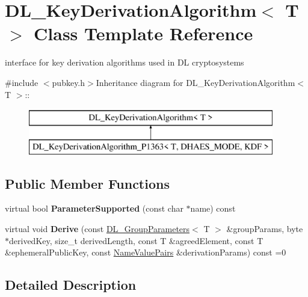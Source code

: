 \hypertarget{class_d_l___key_derivation_algorithm}{
\section{DL\_\-KeyDerivationAlgorithm$<$ T $>$ Class Template Reference}
\label{class_d_l___key_derivation_algorithm}
}


interface for key derivation algorithms used in DL cryptosystems  


{\ttfamily \#include $<$pubkey.h$>$}Inheritance diagram for DL\_\-KeyDerivationAlgorithm$<$ T $>$::\begin{figure}[H]
\begin{center}
\leavevmode
\includegraphics[height=2cm]{class_d_l___key_derivation_algorithm}
\end{center}
\end{figure}
\subsection*{Public Member Functions}
\begin{DoxyCompactItemize}
\item 
\hypertarget{class_d_l___key_derivation_algorithm_a4cc409b63f8d026d8671c631e354e672}{
virtual bool {\bfseries ParameterSupported} (const char $\ast$name) const }
\label{class_d_l___key_derivation_algorithm_a4cc409b63f8d026d8671c631e354e672}

\item 
\hypertarget{class_d_l___key_derivation_algorithm_a79ec03589390f116d0ced324255cd57f}{
virtual void {\bfseries Derive} (const \hyperlink{class_d_l___group_parameters}{DL\_\-GroupParameters}$<$ T $>$ \&groupParams, byte $\ast$derivedKey, size\_\-t derivedLength, const T \&agreedElement, const T \&ephemeralPublicKey, const \hyperlink{class_name_value_pairs}{NameValuePairs} \&derivationParams) const =0}
\label{class_d_l___key_derivation_algorithm_a79ec03589390f116d0ced324255cd57f}

\end{DoxyCompactItemize}


\subsection{Detailed Description}
